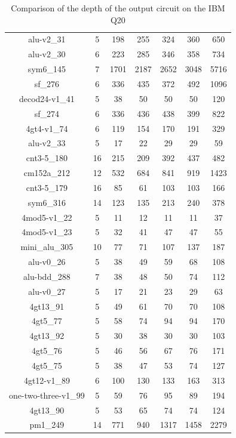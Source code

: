 \documentclass[runningheads]{llncs}
\begin{document}
\begin{table}[H]
\begin{center}
\begin{tabular}{|c|c|c|c|c|c|c|}
							alu-v2\_31 & 5 & 198 & 255 & 324 & 360 & 650 \\
							alu-v2\_30 & 6 & 223 & 285 & 346 & 358 & 734 \\
							sym6\_145 & 7 & 1701 & 2187 & 2652 & 3048 & 5716 \\
							sf\_276 & 6 & 336 & 435 & 372 & 492 & 1096 \\
							decod24-v1\_41 & 5 & 38 & 50 & 50 & 50 & 120 \\
							sf\_274 & 6 & 336 & 436 & 438 & 399 & 822 \\
							4gt4-v1\_74 & 6 & 119 & 154 & 170 & 191 & 329 \\
							alu-v2\_33 & 5 & 17 & 22 & 29 & 29 & 59 \\
							cnt3-5\_180 & 16 & 215 & 209 & 392 & 437 & 482 \\
							cm152a\_212 & 12 & 532 & 684 & 841 & 919 & 1423 \\
							cnt3-5\_179 & 16 & 85 & 61 & 103 & 103 & 166 \\
							sym6\_316 & 14 & 123 & 135 & 213 & 240 & 378 \\
							4mod5-v1\_22 & 5 & 11 & 12 & 11 & 11 & 37 \\
							4mod5-v1\_23 & 5 & 32 & 41 & 47 & 47 & 55 \\
							mini\_alu\_305 & 10 & 77 & 71 & 107 & 137 & 187 \\
							alu-v0\_26 & 5 & 38 & 49 & 59 & 68 & 108 \\
							alu-bdd\_288 & 7 & 38 & 48 & 50 & 74 & 112 \\
							alu-v0\_27 & 5 & 17 & 21 & 23 & 29 & 63 \\
							4gt13\_91 & 5 & 49 & 61 & 70 & 70 & 108 \\
							4gt5\_77 & 5 & 58 & 74 & 94 & 94 & 170 \\
							4gt13\_92 & 5 & 30 & 38 & 30 & 30 & 103 \\
							4gt5\_76 & 5 & 46 & 56 & 67 & 76 & 171 \\
							4gt5\_75 & 5 & 38 & 47 & 53 & 74 & 127 \\
							4gt12-v1\_89 & 6 & 100 & 130 & 133 & 163 & 313 \\
							one-two-three-v1\_99 & 5 & 59 & 76 & 95 & 89 & 194 \\
							4gt13\_90 & 5 & 53 & 65 & 74 & 74 & 124 \\
							pm1\_249 & 14 & 771 & 940 & 1317 & 1458 & 2279 \\
						\hline
							\end{tabular} 
							\end{center} 
							\caption{Comparison of  the depth of the output circuit on the IBM Q20} 
							\label{tab7}	
						\end{table}
\end{document}
